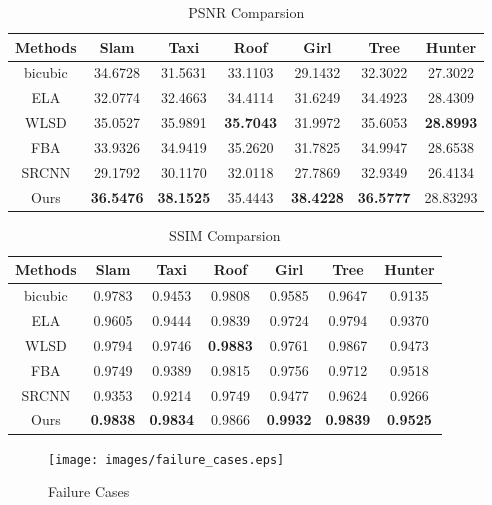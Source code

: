 \begin{table*}
\center
\begin{tabular}{|c|c|c|c|c|c|c|}
  \hline
  Methods & Slam         & Taxi & Roof & Girl      & Tree  & Hunter   \\\hline
  bicubic & 34.6728          & 31.5631             &33.1103             &29.1432    		 & 32.3022              & 27.3022  \\  \hline
  ELA     & 32.0774          & 32.4663             &34.4114             &31.6249             & 34.4923               & 28.4309  \\ \hline
  WLSD    & 35.0527          & 35.9891             &\textbf{35.7043}    &31.9972             & 35.6053               & \textbf{28.8993} \\ \hline
  FBA     & 33.9326          & 34.9419             &35.2620             &31.7825             & 34.9947               & 28.6538  \\ \hline
  SRCNN   & 29.1792          & 30.1170             &32.0118             &27.7869             & 32.9349               & 26.4134  \\ \hline
  Ours    & \textbf{36.5476} & \textbf{38.1525}    &35.4443             &\textbf{38.4228}    &\textbf{36.5777}       & 28.83293 \\ \hline
\end{tabular}
\caption{PSNR Comparsion}
\label{tab:psnr_comparsion}
\end{table*}
\begin{table*}
	\center
	\begin{tabular}{|c|c|c|c|c|c|c|}
		\hline
		Methods & Slam        & Taxi       & Roof       			& Girl             & Tree             & Hunter  \\\hline
		bicubic & 0.9783          & 0.9453           & 0.9808     			&0.9585            &0.9647            & 0.9135   \\  \hline
		ELA     & 0.9605          & 0.9444           & 0.9839     			&0.9724            &0.9794            & 0.9370   \\ \hline
		WLSD    & 0.9794          & 0.9746           & \textbf{0.9883}      &0.9761            &0.9867            & 0.9473  \\ \hline
		FBA     & 0.9749          & 0.9389           & 0.9815     			&0.9756        	   &0.9712            & 0.9518   \\ \hline
		SRCNN   & 0.9353          & 0.9214           & 0.9749     			&0.9477            &0.9624            & 0.9266 \\ \hline
		Ours    & \textbf{0.9838} & \textbf{0.9834}  & 0.9866     			& \textbf{0.9932}  &\textbf{0.9839 } & \textbf{0.9525 } \\ \hline
	\end{tabular}
	\caption{SSIM Comparsion}
	\label{tab:ssim_comparsion}
\end{table*}
\fi
\begin{figure}[!tp]
	\centering
	\texttt{[image: images/failure\_cases.eps]}\\
	\caption{Failure Cases}\label{fig:failure_cases}
\end{figure}




